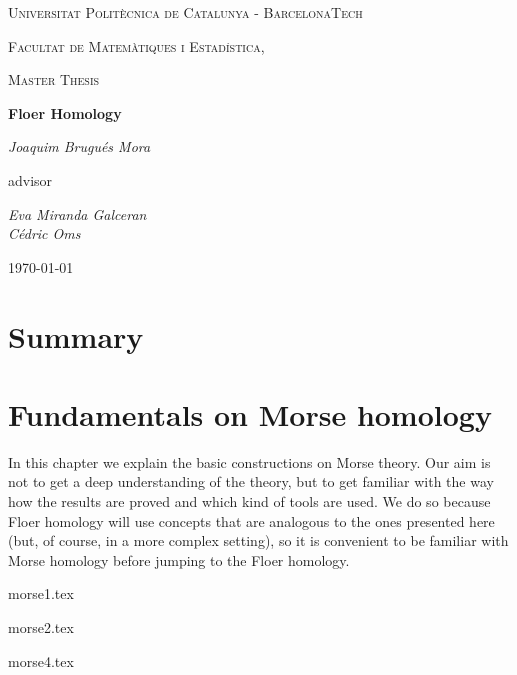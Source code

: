 \documentclass[a4paper,11pt]{book}
\theoremstyle{indented}
\begin{document}
\begin{titlepage}
	\centering
	{\scshape\LARGE Universitat Politècnica de Catalunya - BarcelonaTech\par}
	{\scshape\LARGE Facultat de Matemàtiques i Estadística, \par}
	\vspace{1cm}
	{\scshape\Large Master Thesis\par}
	\vspace{1.5cm}
	{\huge\bfseries Floer Homology\par}
	\vspace{2cm}
	{\Large\itshape Joaquim Brugués Mora\par}
	\vfill
	advisor\par
	{\Large\itshape Eva Miranda Galceran \\ Cédric Oms \par}

	\vfill

	{\large \today\par}
\end{titlepage}


\chapter*{Summary}


\tableofcontents

\mainmatter

\chapter{Fundamentals on Morse homology}
In this chapter we explain the basic constructions on Morse theory. Our aim is not to get a deep understanding of the theory, but to get familiar with the way how the results are proved and which kind of tools are used. We do so because Floer homology will use concepts that are analogous to the ones presented here (but, of course, in a more complex setting), so it is convenient to be familiar with Morse homology before jumping to the Floer homology.

{morse1.tex}

 {morse2.tex}


 {morse4.tex}



\end{document}
